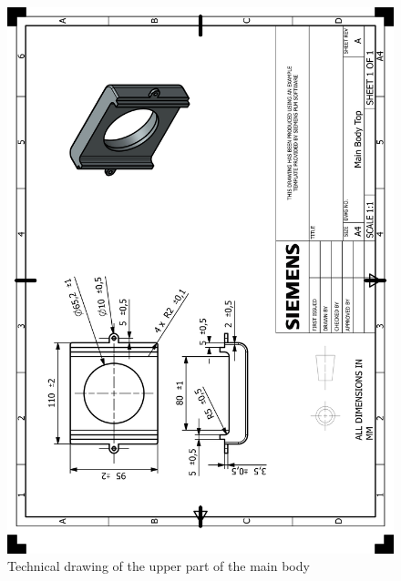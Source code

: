 \documentclass[12pt]{article}
\begin{document}
\begin{appendices}
\begin{figure}[H]
    \centering
    \includegraphics[width=\textwidth]{HP_Main Body Top.png} 
    \caption{Technical drawing of the upper part of the main body}
    \label{fig:technical-drawing}
\end{figure}


\end{appendices}
\end{document}
